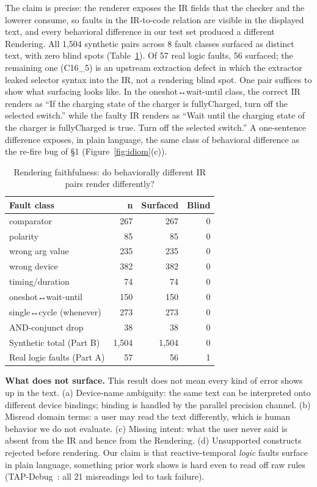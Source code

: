 \documentclass[sigconf,nonacm,anonymous,review]{acmart}
\begin{document}
The claim is precise: the renderer exposes the IR fields that the checker and the lowerer consume, so faults in the IR-to-code relation are visible in the displayed text, and every behavioral difference in our test set produced a different Rendering. All 1,504 synthetic pairs across 8 fault classes surfaced as distinct text, with zero blind spots (Table~\ref{tab:faithful}). Of 57 real logic faults, 56 surfaced; the remaining one (C16\_5) is an upstream extraction defect in which the extractor leaked selector syntax into the IR, not a rendering blind spot. One pair suffices to show what surfacing looks like. In the oneshot↔wait-until class, the correct IR renders as ``If the charging state of the charger is fullyCharged, turn off the selected switch.'' while the faulty IR renders as ``Wait until the charging state of the charger is fullyCharged is true. Turn off the selected switch.'' A one-sentence difference exposes, in plain language, the same class of behavioral difference as the re-fire bug of \S1 (Figure~\ref{fig:idiom}(c)).

\begin{table}[t]
\centering
\caption{Rendering faithfulness: do behaviorally different IR pairs render differently?}
\label{tab:faithful}
\small
\begin{tabular}{lrrr}
\toprule
Fault class & n & Surfaced & Blind \\
\midrule
comparator                & 267 & 267 & 0 \\
polarity                  & 85  & 85  & 0 \\
wrong arg value           & 235 & 235 & 0 \\
wrong device              & 382 & 382 & 0 \\
timing/duration           & 74  & 74  & 0 \\
oneshot↔wait-until        & 150 & 150 & 0 \\
single↔cycle (whenever)   & 273 & 273 & 0 \\
AND-conjunct drop         & 38  & 38  & 0 \\
\midrule
Synthetic total (Part B)   & 1,504 & 1,504 & 0 \\
Real logic faults (Part A) & 57  & 56  & 1 \\
\bottomrule
\end{tabular}
\end{table}

\textbf{What does not surface.} This result does not mean every kind of error shows up in the text. (a) Device-name ambiguity: the same text can be interpreted onto different device bindings; binding is handled by the parallel precision channel. (b) Misread domain terms: a user may read the text differently, which is human behavior we do not evaluate. (c) Missing intent: what the user never said is absent from the IR and hence from the Rendering. (d) Unsupported constructs rejected before rendering. Our claim is that reactive-temporal \emph{logic} faults surface in plain language, something prior work shows is hard even to read off raw rules (TAP-Debug~\cite{tapdebug}: all 21 misreadings led to task failure).
\end{document}
